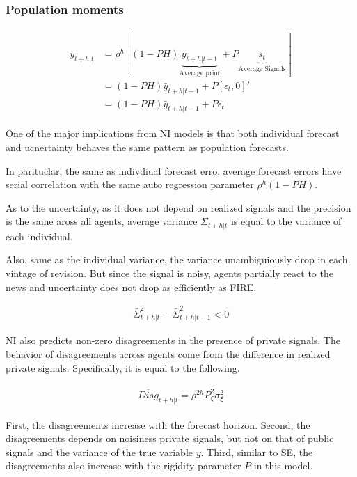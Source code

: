 \documentclass[]{article}
\begin{document}
\subsubsection{Population moments}

\begin{eqnarray}
\begin{aligned}
\bar y_{t+h|t} & = \rho^h [(1-PH) \underbrace{\bar  y_{t+h|t-1}}_{\text{Average prior}} + P \underbrace{\bar s_{t}}_{\text{Average Signals}}] \\
& = (1-PH) \bar y_{t+h|t-1}+ P [\epsilon_t, 0]' \\
& = (1-PH) \bar y_{t+h|t-1} + P \epsilon_t
\end{aligned}
\end{eqnarray}

One of the major implications from NI models is that both individual forecast and ucnertainty behaves the same pattern as population forecasts. 

In parituclar, the same as indivdiual forecast erro, average forecast errors have serial correlation with the same auto regression parameter $\rho^h(1-PH)$. 

As to the uncertainty, as it does not depend on realized signals and the precision is the same aross all agents, average variance $\bar \Sigma_{t+h|t}$ is equal to the variance of each individual. 

Also, same as the individual variance, the variance unambiguiously drop in each vintage of revision. But since the signal is noisy, agents partially react to the news and uncertainty does not drop as efficiently as FIRE. 

\begin{eqnarray}
\bar \Sigma^2_{t+h|t} -  \bar \Sigma^2_{t+h|t-1}< 0 
\end{eqnarray}

NI also predicts non-zero disagreements in the presence of private signals. The behavior of disagreements across agents come from the difference in realized private signals. Specifically, it is equal to the following. 

\begin{eqnarray}
\begin{aligned}
\overline {Disg}_{t+h|t} = \rho^{2h} P^2_\xi \sigma^2_\xi  
\end{aligned}
\end{eqnarray}

First, the disagreements increase with the forecast horizon.  Second, the disagreements depends on noisiness private signals, but not on that of public signals and the variance of the true variable $y$. Third, similar to SE, the disagreements also increase with the rigidity parameter $P$ in this model.
\end{document}
